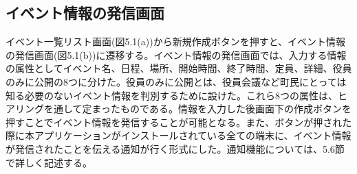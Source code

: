 \subsection{イベント情報の発信画面}%
イベント一覧リスト画面(図5.1(a))から新規作成ボタンを押すと、イベント情報の発信画面(図5.1(b))に遷移する。イベント情報の発信画面では、入力する情報の属性としてイベント名、日程、場所、開始時間、終了時間、定員、詳細、役員のみに公開の8つに分けた。役員のみに公開とは、役員会議など町民にとっては知る必要のないイベント情報を判別するために設けた。これら8つの属性は、ヒアリングを通して定まったものである。情報を入力した後画面下の作成ボタンを押すことでイベント情報を発信することが可能となる。また、ボタンが押された際に本アプリケーションがインストールされている全ての端末に、イベント情報が発信されたことを伝える通知が行く形式にした。通知機能については、5.6節で詳しく記述する。
​
